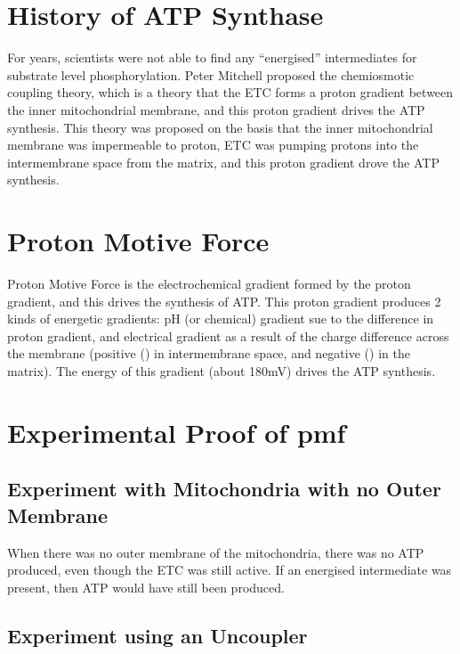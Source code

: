 \section{History of ATP Synthase}

For years, scientists were not able to find any ``energised'' intermediates for substrate level phosphorylation.
Peter Mitchell proposed the chemiosmotic coupling theory, which is a theory that the ETC forms a proton gradient between the inner mitochondrial membrane, and this proton gradient drives the ATP synthesis.
This theory was proposed on the basis that the inner mitochondrial membrane was impermeable to proton, ETC was pumping protons into the intermembrane space from the matrix, and this proton gradient drove the ATP synthesis.

\section{Proton Motive Force}

\begin{center}
\end{center}

Proton Motive Force is the electrochemical gradient formed by the proton gradient, and this drives the synthesis of ATP.
This proton gradient produces 2 kinds of energetic gradients: pH (or chemical) gradient sue to the difference in proton gradient, and electrical gradient as a result of the charge difference across the membrane (positive () in intermembrane space, and negative () in the matrix).
The energy of this gradient (about 180mV) drives the ATP synthesis.

\section{Experimental Proof of pmf}

\subsection{Experiment with Mitochondria with no Outer Membrane}

When there was no outer membrane of the mitochondria, there was no ATP produced, even though the ETC was still active.
If an energised intermediate was present, then ATP would have still been produced.

\subsection{Experiment using an Uncoupler}


